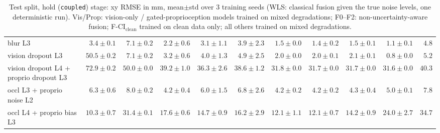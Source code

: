 \begin{table}[p]
{\begin{tabular}{lrrrrrrrrrr}
blur L3 & $3.4{\pm}0.1$ & $7.1{\pm}0.2$ & $2.2{\pm}0.6$ & $3.1{\pm}1.1$ & $3.9{\pm}2.3$ & $1.5{\pm}0.0$ & $1.4{\pm}0.2$ & $1.5{\pm}0.1$ & $1.1{\pm}0.1$ & $4.8$ \\
vision dropout L3 & $50.5{\pm}0.2$ & $7.1{\pm}0.2$ & $3.2{\pm}0.6$ & $4.0{\pm}1.3$ & $4.9{\pm}2.5$ & $2.0{\pm}0.0$ & $2.0{\pm}0.1$ & $2.1{\pm}0.1$ & $0.8{\pm}0.0$ & $5.2$ \\
vision dropout L4 {+} proprio dropout L3 & $72.9{\pm}0.2$ & $50.0{\pm}0.0$ & $39.2{\pm}1.0$ & $36.3{\pm}2.6$ & $38.6{\pm}1.2$ & $31.8{\pm}0.0$ & $31.7{\pm}0.0$ & $31.7{\pm}0.0$ & $31.6{\pm}0.0$ & $40.3$ \\
occl L3 {+} proprio noise L2 & $6.3{\pm}0.6$ & $8.0{\pm}0.2$ & $4.2{\pm}0.4$ & $6.0{\pm}1.5$ & $6.8{\pm}2.6$ & $4.2{\pm}0.2$ & $4.2{\pm}0.2$ & $4.3{\pm}0.4$ & $5.0{\pm}0.1$ & $7.8$ \\
occl L4 {+} proprio bias L3 & $10.3{\pm}0.7$ & $31.4{\pm}0.1$ & $17.6{\pm}0.6$ & $14.7{\pm}0.9$ & $16.2{\pm}2.9$ & $12.1{\pm}1.1$ & $12.1{\pm}0.7$ & $14.2{\pm}0.9$ & $24.0{\pm}2.7$ & $34.7$ \\
\bottomrule\end{tabular}}
\caption{Test split, hold (\texttt{coupled}) stage: xy RMSE in mm, mean$\pm$std over 3 training seeds (WLS: classical fusion given the true noise levels, one deterministic run). Vis/Prop: vision-only / gated-proprioception models trained on mixed degradations; F0--F2: non-uncertainty-aware fusion; F-CI$_{\mathrm{clean}}$ trained on clean data only; all others trained on mixed degradations.}\label{tab:app_rmse}\end{table}


